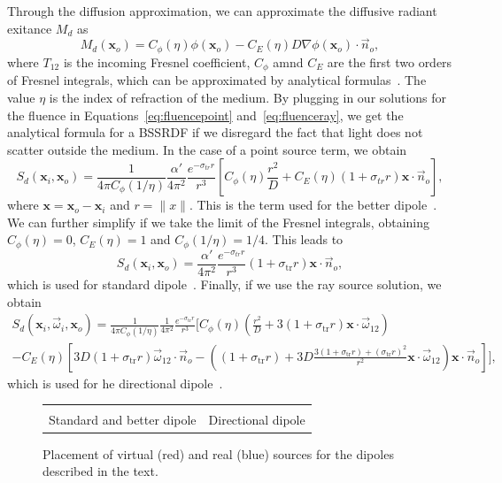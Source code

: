 Through the diffusion approximation, we can approximate the diffusive radiant exitance $M_d$ as
\begin{equation*}
M_d(\mathbf{x}_o) =  C_\phi(\eta) \phi(\mathbf{x}_o) - C_E(\eta) D \nabla\phi(\mathbf{x}_o) \cdot \vec{n}_o,
\end{equation*}
where $T_{12}$ is the incoming Fresnel coefficient, $C_\phi$ amnd $C_E$ are the first two orders of Fresnel integrals, which can be approximated by analytical formulas~\cite{dEon2011}. The value $\eta$ is the index of refraction of the medium. By plugging in our solutions for the fluence in Equations~\ref{eq:fluencepoint} and~\ref{eq:fluenceray}, we get the analytical formula for a BSSRDF if we disregard the fact that light does not scatter outside the medium. In the case of a point source term, we obtain
\begin{equation*}
S_d(\mathbf{x}_i, \mathbf{x}_o)  = \frac{1}{4\pi C_\phi(1/\eta)} \frac{\alpha'}{4 \pi^2} \frac{e^{-\sigma_{tr} r}}{r^3} \left[ C_\phi(\eta) \frac{r^2}{D} + C_E(\eta) (1 + \sigma_{tr} r) \mathbf{x} \cdot \vec{n}_o \right],
\end{equation*}
where $\mathbf{x} = \mathbf{x}_o - \mathbf{x}_i$ and $r = \|x\|$. This is the term used for the better dipole~\cite{dEon2012}. We can further simplify if we take the limit of the Fresnel integrals, obtaining $C_\phi(\eta) = 0$, $C_E(\eta) = 1$ and $C_\phi(1/\eta) = 1/4$. This leads to
\begin{equation*}
S_d(\mathbf{x}_i, \mathbf{x}_o)  =  \frac{\alpha'}{4 \pi^2} \frac{e^{-\sigma_{tr} r}}{r^3} (1 + \sigma_\text{tr} r) \mathbf{x} \cdot \vec{n}_o,
\end{equation*}
which is used for standard dipole~\cite{Jensen2001}. Finally, if we use the ray source solution, we obtain
\begin{multline*}
S_d(\mathbf{x}_i, \vec{\omega}_i, \mathbf{x}_o)  = \frac{1}{4\pi C_\phi(1/\eta)} \frac{1}{4 \pi^2} \frac{e^{-\sigma_\text{tr} r}}{r^3} \bigg[ C_\phi(\eta) (\frac{r^2}{D} +  3 (1 + \sigma_\text{tr} r) \mathbf{x}\cdot\vec{\omega}_{12} ) \\ - C_E(\eta) \left[3D (1 + \sigma_\text{tr} r) \vec{\omega}_{12} \cdot \vec{n}_o - \left((1 + \sigma_\text{tr} r) + 3D \frac{3 (1 + \sigma_\text{tr} r)  + (\sigma_\text{tr} r)^2}{r^2}\mathbf{x}\cdot\vec{\omega}_{12}\right) \mathbf{x} \cdot \vec{n}_o\right] \bigg],
\end{multline*}
which is used for he directional dipole~\cite{Frisvad2014}. 
%
\begin{figure}
\centering
\begin{tabular}{@{}c@{\hskip 1em}c@{}}
\def\svgwidth{0.5\textwidth} &  \def\svgwidth{0.5\textwidth} \\
Standard and better dipole &  Directional dipole \\
\end{tabular}
\caption{Placement of virtual (red) and real (blue) sources for the dipoles described in the text.} 
\label{fig:bssrdfsources}
\end{figure}
